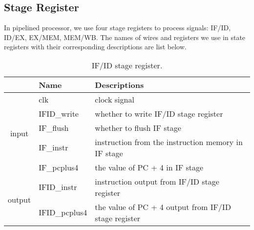 \documentclass[a4paper]{article}
\begin{document}
\subsection{Stage Register}
In pipelined processor, we use four stage registers to process signals: IF/ID, ID/EX, EX/MEM, MEM/WB. The names of wires and registers we use in state registers with their corresponding descriptions are list below.
\begin{table}[H]
    \centering
    \begin{tabular}{|c|l|l|}
        \hline
        &Name&Descriptions\\
        \hline
        \multirow{5}{*}{input}&clk&clock signal\\
        \cline{2-3}
        &IFID\_write&whether to write IF/ID stage register\\
        \cline{2-3}
        &IF\_flush&whether to flush IF stage\\
        \cline{2-3}
        &IF\_instr&instruction from the instruction memory in IF stage\\
        \cline{2-3}
        &IF\_pcplus4&the value of PC + 4 in IF stage\\
        \hline
        \multirow{2}{*}{output}&IFID\_instr&instruction output from IF/ID stage register\\
        \cline{2-3}
        &IFID\_pcplus4&the value of PC + 4 output from IF/ID stage register\\
        \hline
    \end{tabular}
    \caption{IF/ID stage register.}
\end{table}
\end{document}
